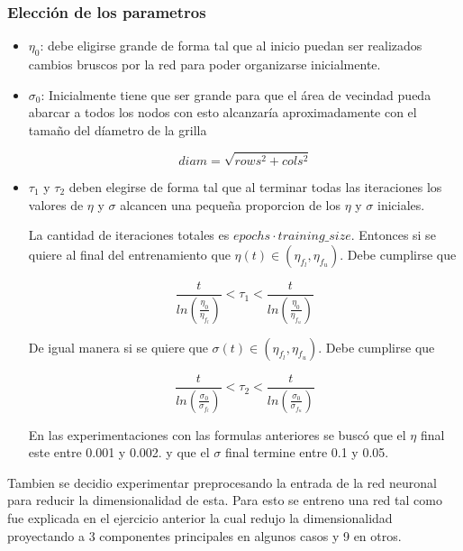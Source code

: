 \subsubsection{Elección de los parametros}
\begin{itemize}
	\item $\eta_0$: debe eligirse grande de forma tal que al inicio
puedan ser realizados cambios bruscos por la red para
poder organizarse inicialmente.

	\item $\sigma_0$: Inicialmente tiene que ser grande para que el área
de vecindad pueda abarcar a todos los nodos con esto alcanzaría aproximadamente
con el tamaño del díametro de la grilla

\[
	diam = \sqrt{rows^2+cols^2}
\]
	\item $\tau_1$ y $\tau_2$ deben elegirse de forma tal que al terminar
	todas las iteraciones los valores de $\eta$ y $\sigma$ alcancen
	una pequeña proporcion de los $\eta$ y $\sigma$ iniciales.

	La cantidad de iteraciones totales es $epochs \cdot training\_size $.
	Entonces si se quiere al final del entrenamiento que $\eta(t) \in (\eta_{f_l}, \eta_{f_u})$.
	Debe cumplirse que

	\[ \frac{t}{ln(\frac{\eta_0}{\eta_{f_l}})} < \tau_{1} < \frac{t}{ln(\frac{\eta_0}{\eta_{f_u}})} \]

	De igual manera si se quiere que $\sigma(t) \in (\eta_{f_l}, \eta_{f_u})$. Debe cumplirse que

	\[ \frac{t}{ln(\frac{\sigma_0}{\sigma_{f_l}})} < \tau_{2} < \frac{t}{ln(\frac{\sigma_0}{\sigma_{f_u}})} \]

	En las experimentaciones con las formulas anteriores se buscó que el $\eta$ final este entre 0.001 y 0.002.
	y que el $\sigma$ final termine entre 0.1 y 0.05.

\end{itemize}
Tambien se decidio experimentar preprocesando la entrada de la red neuronal para reducir la dimensionalidad de esta.
 Para esto se entreno una red tal como fue explicada en el ejercicio anterior la cual redujo la dimensionalidad proyectando
 a 3 componentes principales en algunos casos y 9 en otros.

